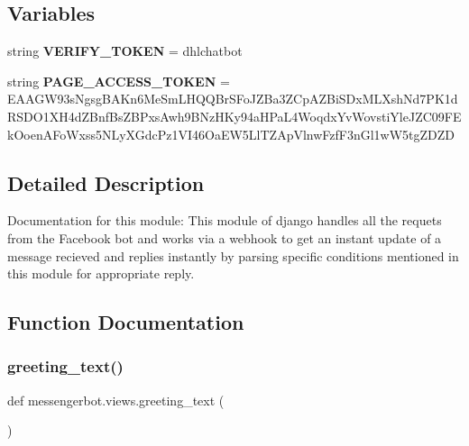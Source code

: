 \subsection*{Variables}
\begin{DoxyCompactItemize}
\item 
\mbox{\label{namespacemessengerbot_1_1views_acc5db9b1386d0938d9b1c07a9c83604e}} 
string {\bfseries V\+E\+R\+I\+F\+Y\+\_\+\+T\+O\+K\+EN} = \textquotesingle{}dhlchatbot\textquotesingle{}
\item 
\mbox{\label{namespacemessengerbot_1_1views_a22c4a4c96dbae1b10bd243bdbd7b0505}} 
string {\bfseries P\+A\+G\+E\+\_\+\+A\+C\+C\+E\+S\+S\+\_\+\+T\+O\+K\+EN} = \textquotesingle{}E\+A\+A\+G\+W93s\+Ngsg\+B\+A\+Kn6\+Me\+Sm\+L\+H\+Q\+Q\+Br\+S\+Fo\+J\+Z\+Ba3\+Z\+Cp\+A\+Z\+Bi\+S\+Dx\+M\+L\+Xsh\+Nd7\+P\+K1d\+R\+S\+D\+O1\+X\+H4d\+Z\+Bnf\+Bs\+Z\+B\+Pxs\+Awh9\+B\+Nz\+H\+Ky94a\+H\+Pa\+L4\+Woqdx\+Yv\+Wovsti\+Yle\+J\+Z\+C09\+F\+Ek\+Ooen\+A\+Fo\+Wxss5\+N\+Ly\+X\+Gdc\+Pz1\+V\+I46\+Oa\+E\+W5\+Ll\+T\+Z\+Ap\+Vlnw\+Fzf\+F3n\+Gl1w\+W5tg\+Z\+D\+ZD\textquotesingle{}
\end{DoxyCompactItemize}


\subsection{Detailed Description}
\begin{DoxyVerb}Documentation for this module:
This module of django handles all the requets from the Facebook bot and works via a webhook to get an instant update of a message recieved and replies instantly by parsing specific conditions mentioned in this module for appropriate reply. 
\end{DoxyVerb}
 

\subsection{Function Documentation}
\mbox{\label{namespacemessengerbot_1_1views_a001bef22e3a7e6c9385e486f6e22b679}} 
\subsubsection{\texorpdfstring{greeting\+\_\+text()}{greeting\_text()}}
{\footnotesize\ttfamily def messengerbot.\+views.\+greeting\+\_\+text (\begin{DoxyParamCaption}{ }\end{DoxyParamCaption})}

